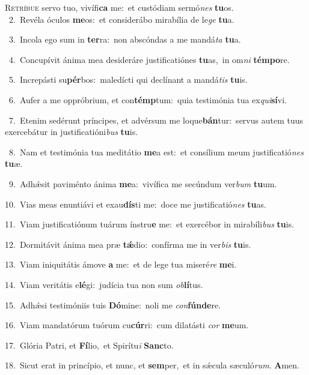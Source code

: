 \lettrine{\initial\textcolor{\initialcolor}{R}}{etríbue} servo tuo, vivífi\textbf{ca} me:~\star et custódiam sermó\textit{nes} \textbf{tu}\-os.\\
{\numbfont\textcolor{\numbcolor}{~2.}}~Revéla óculos \textbf{me}\-os:~\star et considerábo mirabília de le\textit{ge} \textbf{tu}\-a.\par
{\numbfont\textcolor{\numbcolor}{~3.}}~Incola ego sum in \textbf{ter}\-ra:~\star non abscóndas a me mandá\textit{ta} \textbf{tu}\-a.\par
{\numbfont\textcolor{\numbcolor}{~4.}}~Concupívit ánima mea desideráre justificatiónes \textbf{tu}\-as,~\star in om\textit{ni} \textbf{tém}\-\textbf{po}re.\par
{\numbfont\textcolor{\numbcolor}{~5.}}~Increpásti su\-\textbf{pér}\-bos:~\star maledícti qui declínant a mandá\textit{tis} \textbf{tu}\-is.\par
{\numbfont\textcolor{\numbcolor}{~6.}}~Aufer a me oppróbrium, et con\-\textbf{témp}\-tum:~\star quia testimónia tua ex\-\textit{qui}\-\textbf{sí}vi.\par
{\numbfont\textcolor{\numbcolor}{~7.}}~Etenim sedérunt príncipes, et advérsum me loque\-\textbf{bán}\-tur:~\star servus autem tuus exercebátur in justificatióni\textit{bus} \textbf{tu}\-is.\par
{\numbfont\textcolor{\numbcolor}{~8.}}~Nam et testimónia tua meditátio \textbf{me}\-a est:~\star et consílium meum justificatió\textit{nes} \textbf{tu}\-æ.\par
{\numbfont\textcolor{\numbcolor}{~9.}}~Adhǽsit paviménto ánima \textbf{me}\-a:~\star vivífica me secúndum ver\textit{bum} \textbf{tu}\-um.\par
{\numbfont\textcolor{\numbcolor}{10.}}~Vias meas enuntiávi et exau\-\textbf{dís}\-ti me:~\star doce me justificatió\textit{nes} \textbf{tu}\-as.\par
{\numbfont\textcolor{\numbcolor}{11.}}~Viam justificatiónum tuárum ínstru\textbf{e} me:~\star et exercébor in mirabíli\textit{bus} \textbf{tu}\-is.\par
{\numbfont\textcolor{\numbcolor}{12.}}~Dormitávit ánima mea præ \textbf{tǽ}\-dio:~\star confírma me in ver\textit{bis} \textbf{tu}\-is.\par
{\numbfont\textcolor{\numbcolor}{13.}}~Viam iniquitátis ámove \textbf{a} me:~\star et de lege tua miseré\textit{re} \textbf{me}\-i.\par
{\numbfont\textcolor{\numbcolor}{14.}}~Viam veritátis e\-\textbf{lé}\-gi:~\star judícia tua non sum \textit{ob}\-\textbf{lí}tus.\par
{\numbfont\textcolor{\numbcolor}{15.}}~Adhǽsi testimóniis tuis \textbf{Dó}\-mine:~\star noli me \textit{con}\-\textbf{fún}\textbf{de}re.\par
{\numbfont\textcolor{\numbcolor}{16.}}~Viam mandatórum tuórum cu\-\textbf{cúr}\-ri:~\star cum dilatásti \textit{cor} \textbf{me}\-um.\par
{\numbfont\textcolor{\numbcolor}{17.}}~Glória Patri, et \textbf{Fí}\-lio,~\star et Spirítu\textit{i} \textbf{Sanc}\-to.\par
{\numbfont\textcolor{\numbcolor}{18.}}~Sicut erat in princípio, et nunc, et \textbf{sem}\-per,~\star et in sǽcula sæculó\-\textit{rum}\-. \textbf{A}\-men.\par
